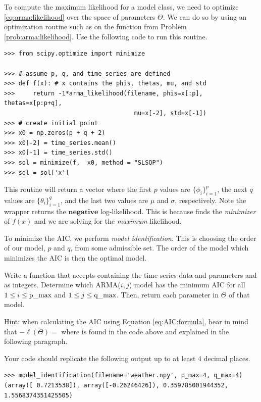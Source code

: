 To compute the maximum likelihood for a model class, we need to optimize
\ref{eq:arma:likelihood} over the space of parameters $\Theta$. We can do so
by using an optimization routine such as  on the function  from Problem \ref{prob:arma:likelihood}.
Use the following code to run this routine.

\begin{lstlisting}
>>> from scipy.optimize import minimize

>>> # assume p, q, and time_series are defined
>>> def f(x): # x contains the phis, thetas, mu, and std
>>>     return -1*arma_likelihood(filename, phis=x[:p], thetas=x[p:p+q], 
                                    mu=x[-2], std=x[-1])
>>> # create initial point
>>> x0 = np.zeros(p + q + 2)
>>> x0[-2] = time_series.mean()
>>> x0[-1] = time_series.std()
>>> sol = minimize(f,  x0, method = "SLSQP")
>>> sol = sol['x']
\end{lstlisting}

This routine will return a vector  where the first $p$ values are $\{\phi_i\}_{i=1}^p$, the next $q$ values are $\{\theta_i\}_{i=1}^q$, and the last two values are $\mu$ and $\sigma$, respectively.
Note the wrapper  returns the $\mathbf{negative}$ log-likelihood.
This is because  finds the \emph{minimizer} of $f(x)$ and we are solving for the \emph{maximum} likelihood.

To minimize the AIC, we perform \emph{model identification}.
This is choosing the order of our model, $p$ and $q$, from some admissible set.
The order of the model which minimizes the AIC is then the optimal model.

\begin{problem}
\label{prob:model-identification}
Write a function  that accepts  containing the time series data and parameters  and  as integers. 
Determine which ARMA($i,j$) model has the minimum AIC for all $1\leq i \leq \text{\li{p_max}}$ and $1\leq j \leq \text{\li{q_max}}$.
Then, return each parameter in $\Theta$ of that model.

\noindent Hint: when calculating the AIC using Equation \ref{eq:AIC:formula}, bear in mind that $-\ell(\Theta)=$  where  is found in the code above and explained in the following paragraph.

Your code should replicate the following output up to at least 4 decimal places.
\begin{lstlisting}
>>> model_identification(filename='weather.npy', p_max=4, q_max=4)
(array([ 0.7213538]), array([-0.26246426]), 0.359785001944352, 1.5568374351425505)
\end{lstlisting}
\end{problem}


